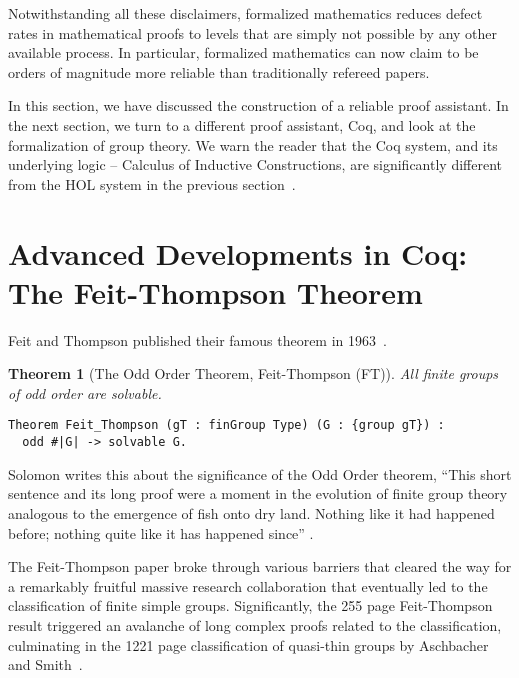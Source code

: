 \documentclass[brochure,english,12pt]{bourbaki}
\theoremstyle{plain}
\newtheorem{theorem}[equation]{Theorem}
\begin{document}
Notwithstanding all these disclaimers,  formalized mathematics reduces defect rates
in mathematical proofs to levels that are simply not possible by any other available process.
In particular, formalized mathematics can now claim to be orders of magnitude more reliable than 
traditionally refereed papers.  

\bigskip

In this section, we have discussed the construction of a reliable proof assistant.  In the next section,
we turn to a different proof assistant, Coq, and look at the formalization of group theory.
We warn the reader that the Coq system, and its underlying logic -- Calculus of Inductive Constructions, 
are significantly different from the HOL system in the previous section~\cite{CiC}.


\section{Advanced Developments in Coq: The Feit-Thompson Theorem}


Feit and Thompson published their famous theorem in 1963~\cite{FT}.

\begin{theorem}[The Odd Order Theorem, Feit-Thompson (FT)]  All finite groups of odd order are solvable.
\end{theorem}

\begin{lstlisting}[keepspaces=true,stringstyle=\tt,basicstyle=\small,frame=single,framesep=8pt,mathescape,morekeywords={Theorem},columns=flexible]
Theorem Feit_Thompson (gT : finGroup Type) (G : {group gT}) :
  odd #|G| -> solvable G.
\end{lstlisting}

Solomon writes this about the significance of the Odd Order theorem, ``This short sentence and its long proof
were a moment in the evolution of finite group theory analogous to the emergence of fish onto dry
land.  Nothing like it had happened before; nothing quite like it has happened since'' \cite{Sol01}.

The Feit-Thompson paper broke through various barriers that cleared the way for a 
remarkably fruitful massive research collaboration that eventually led to the classification
of finite simple groups.  Significantly, the  255 page Feit-Thompson result
triggered an avalanche of long complex proofs related to the classification, 
culminating in the 1221 page classification of quasi-thin groups by Aschbacher and Smith~\cite{aschbacher2004classification}.
\end{document}
